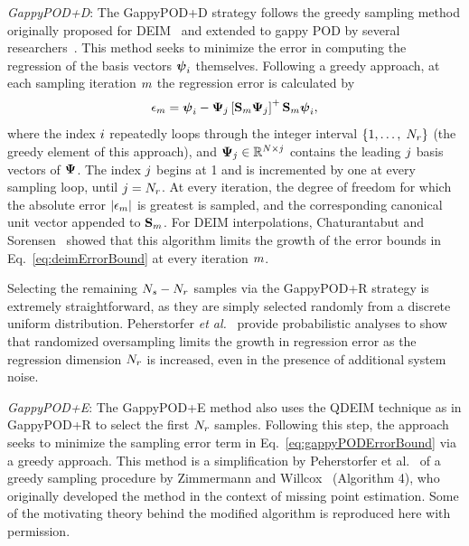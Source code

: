 \vspace{0.5cm}
\noindent \textit{GappyPOD+D}:
The GappyPOD+D strategy follows the greedy sampling method originally proposed for DEIM~\cite{Chaturantabut2010} and extended to gappy POD by several researchers~\cite{Zhou2012,Carlberg2013}. This method seeks to minimize the error in computing the regression of the basis vectors $\boldsymbol{\psi}_{i}$ themselves. Following a greedy approach, at each sampling iteration $m$ the regression error is calculated by
%
\begin{equation}
    \errVec_{\greedyIdx} = \deimBasisVec_{\dummyIdx} - \deimBasis_{\dummyIdxTwo} \left[ \sampMat_{\greedyIdx} \deimBasis_{\dummyIdxTwo} \right]^+ \sampMat_{\greedyIdx}\deimBasisVec_{\dummyIdx},
\end{equation}
%
where the index $i$ repeatedly loops through the integer interval $\{1, \hdots, \; N_r\}$ (the greedy element of this approach), and $\deimBasis_{\dummyIdxTwo} \inRTwo{\numDOF}{\dummyIdxTwo}$ contains the leading $j$ basis vectors of $\deimBasis$. The index $j$ begins at 1 and is incremented by one at every sampling loop, until $j = N_r$. At every iteration, the degree of freedom for which the absolute error $|\epsilon_{m}|$ is greatest is sampled, and the corresponding canonical unit vector appended to $\mathbf{S}_{m}$. For DEIM interpolations, Chaturantabut and Sorensen~\cite{Chaturantabut2010} showed that this algorithm limits the growth of the error bounds in Eq.~\ref{eq:deimErrorBound} at every iteration $m$.

Selecting the remaining $N_s - N_r$ samples via the GappyPOD+R strategy is extremely straightforward, as they are simply selected randomly from a discrete uniform distribution. Peherstorfer \textit{et al.}~\cite{Peherstorfer2020} provide probabilistic analyses to show that randomized oversampling limits the growth in regression error as the regression dimension $N_r$ is increased, even in the presence of additional system noise.

\vspace{0.5cm}
\noindent \textit{GappyPOD+E}:
The GappyPOD+E method also uses the QDEIM technique as in GappyPOD+R to select the first $N_r$ samples. Following this step, the approach seeks to minimize the sampling error term in Eq.~\ref{eq:gappyPODErrorBound} via a greedy approach. This method is a simplification by Peherstorfer et al.~\cite{Peherstorfer2020} of a greedy sampling procedure by Zimmermann and Willcox~\cite{Zimmermann2016} (Algorithm 4), who originally developed the method in the context of missing point estimation. Some of the motivating theory behind the modified algorithm is reproduced here with permission.

